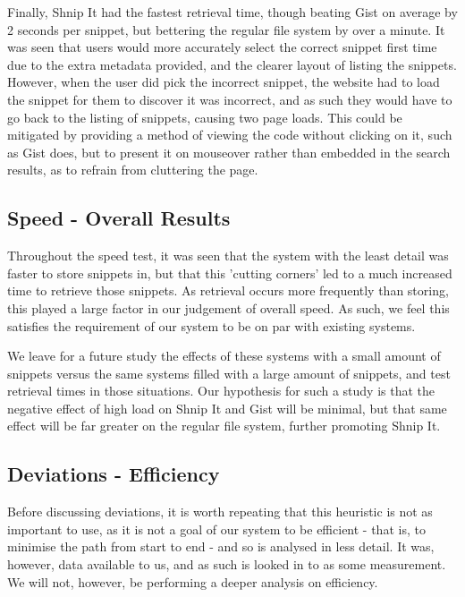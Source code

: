 Finally, Shnip It had the fastest retrieval time, though beating Gist on average by 2 seconds per snippet, but bettering the regular file system by over a minute.
It was seen that users would more accurately select the correct snippet first time due to the extra metadata provided, and the clearer layout of listing the snippets.
However, when the user did pick the incorrect snippet, the website had to load the snippet for them to discover it was incorrect, and as such they would have to go back to the listing of snippets, causing two page loads.
This could be mitigated by providing a method of viewing the code without clicking on it, such as Gist does, but to present it on mouseover rather than embedded in the search results, as to refrain from cluttering the page.

\subsection{Speed - Overall Results}
Throughout the speed test, it was seen that the system with the least detail was faster to store snippets in, but that this 'cutting corners' led to a much increased time to retrieve those snippets. 
As retrieval occurs more frequently than storing, this played a large factor in our judgement of overall speed.
As such, we feel this satisfies the requirement of our system to be on par with existing systems.

We leave for a future study the effects of these systems with a small amount of snippets versus the same systems filled with a large amount of snippets, and test retrieval times in those situations.
Our hypothesis for such a study is that the negative effect of high load on Shnip It and Gist will be minimal, but that same effect will be far greater on the regular file system, further promoting Shnip It.


\subsection{Deviations - Efficiency}
Before discussing deviations, it is worth repeating that this heuristic is not as important to use, as it is not a goal of our system to be efficient - that is, to minimise the path from start to end - and so is analysed in less detail.
It was, however, data available to us, and as such is looked in to as some measurement.
We will not, however, be performing a deeper analysis on efficiency.

